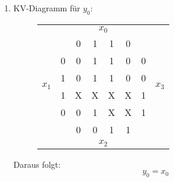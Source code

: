 \documentclass[DIN, pagenumber=false, fontsize=11pt, parskip=half]{scrartcl}
\newcommand{\minTerm}[4]{
    \IfEqCase{#1}{
        {0}{\overline{x_0}\ }
        {1}{x_0}
    }
    \IfEqCase{#2}{
        {0}{\overline{x_1}\ }
        {1}{x_1}
    }
    \IfEqCase{#3}{
        {0}{\overline{x_2}\ }
        {1}{x_2}
    }
    \IfEqCase{#4}{
        {0}{\overline{x_3}\ }
        {1}{x_3}
    }[\PackageError{minTerm}{Values must either be 0 or 1}]
}
\begin{document}
\begin{enumerate}[label=(\alph*)]
\begin{eqnarray*}
			y_1 &=& \minTerm{0}{1}{0}{0} + \minTerm{1}{1}{0}{0} + \minTerm{1}{0}{1}{0} + \minTerm{0}{0}{0}{1} + \minTerm{1}{0}{0}{1} \\
			y_2 &=& \minTerm{0}{0}{1}{0} + \minTerm{0}{1}{1}{0} + \minTerm{1}{1}{1}{0} + \minTerm{0}{0}{0}{1} + \minTerm{1}{0}{0}{1} \\
			y_3 &=& \minTerm{1}{0}{1}{0} + \minTerm{0}{1}{1}{0} + \minTerm{1}{1}{1}{0} + \minTerm{0}{0}{0}{1} + \minTerm{1}{0}{0}{1} \\
		\end{eqnarray*}
		\item 
			KV-Diagramm für $y_0$:
			\begin{figure}[H]
                \centering
                \begin{tabular}{cc|cccc|cc}
                    & &  & \multicolumn{2}{c}{$x_0$} & & \\
                    & & 0 & 1 & 1 & 0\\
                    \midrule
                    \multirow{4}{*}{$x_1$} & 0 & 0 & \cellcolor{blue!50}1 & \cellcolor{blue!50}1 & 0 & 0 &\multirow{4}{*}{$x_3$}\\
                     & 1 & 0 & \cellcolor{blue!50}1 & \cellcolor{blue!50}1 & 0 & 0\\
                     & 1 & X & \cellcolor{blue!50}X & \cellcolor{blue!50}X & X & 1\\
                     & 0 & 0 & \cellcolor{blue!50}1 & \cellcolor{blue!50}X & X & 1\\
                    \midrule
                    & & 0 & 0 & 1 & 1\\
                    & &  & \multicolumn{2}{c}{$x_2$} & & \\
                \end{tabular}
            \end{figure}
			Daraus folgt:
			\begin{equation*}
				y_0 = x_0
			\end{equation*}


\end{enumerate}
\end{document}
